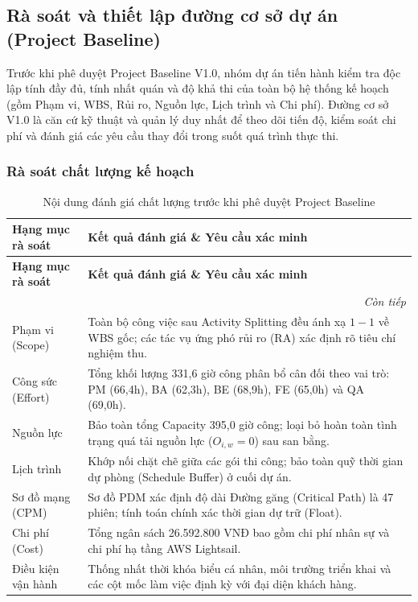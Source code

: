 \clearpage
\subsection{Rà soát và thiết lập đường cơ sở dự án (Project Baseline)}
\label{sec:baseline-review}

Trước khi phê duyệt Project Baseline V1.0, nhóm dự án tiến hành kiểm tra độc lập tính đầy đủ, tính nhất quán và độ khả thi của toàn bộ hệ thống kế hoạch (gồm Phạm vi, WBS, Rủi ro, Nguồn lực, Lịch trình và Chi phí). Đường cơ sở V1.0 là căn cứ kỹ thuật và quản lý duy nhất để theo dõi tiến độ, kiểm soát chi phí và đánh giá các yêu cầu thay đổi trong suốt quá trình thực thi.

\subsubsection{Rà soát chất lượng kế hoạch}

\begingroup\small
\setlength{\tabcolsep}{4pt}\renewcommand{\arraystretch}{1.15}
\begin{longtable}{@{}p{.22\linewidth}p{.70\linewidth}@{}}
\caption{Nội dung đánh giá chất lượng trước khi phê duyệt Project Baseline}\label{tab:review}\\
\toprule
\textbf{Hạng mục rà soát} & \textbf{Kết quả đánh giá \& Yêu cầu xác minh} \\
\midrule\endfirsthead
\toprule
\textbf{Hạng mục rà soát} & \textbf{Kết quả đánh giá \& Yêu cầu xác minh} \\
\midrule\endhead
\midrule\multicolumn{2}{r}{\textit{Còn tiếp}}\\\endfoot
\bottomrule\endlastfoot
Phạm vi (Scope) & Toàn bộ công việc sau Activity Splitting đều ánh xạ $1-1$ về WBS gốc; các tác vụ ứng phó rủi ro (RA) xác định rõ tiêu chí nghiệm thu. \\
Công sức (Effort) & Tổng khối lượng 331,6 giờ công phân bổ cân đối theo vai trò: PM (66,4h), BA (62,3h), BE (68,9h), FE (65,0h) và QA (69,0h). \\
Nguồn lực & Bảo toàn tổng Capacity 395,0 giờ công; loại bỏ hoàn toàn tình trạng quá tải nguồn lực ($O_{i,w}=0$) sau san bằng. \\
Lịch trình & Khớp nối chặt chẽ giữa các gói thi công; bảo toàn quỹ thời gian dự phòng (Schedule Buffer) ở cuối dự án. \\
Sơ đồ mạng (CPM) & Sơ đồ PDM xác định độ dài Đường găng (Critical Path) là 47 phiên; tính toán chính xác thời gian dự trữ (Float). \\
Chi phí (Cost) & Tổng ngân sách 26.592.800 VNĐ bao gồm chi phí nhân sự và chi phí hạ tầng AWS Lightsail. \\
Điều kiện vận hành & Thống nhất thời khóa biểu cá nhân, môi trường triển khai và các cột mốc làm việc định kỳ với đại diện khách hàng. \\
\end{longtable}\endgroup

